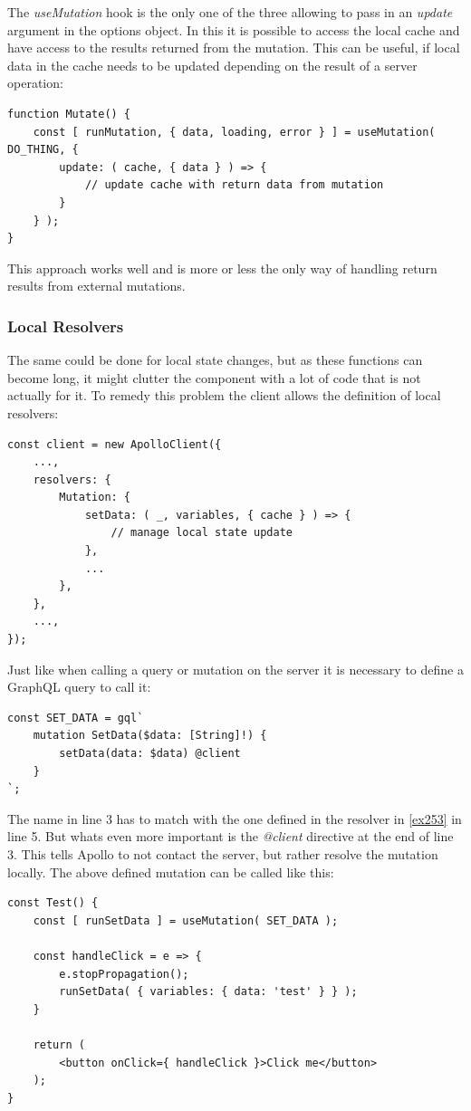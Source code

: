 The \emph{useMutation} hook is the only one of the three allowing to pass in an \emph{update} argument in the options object. In this it is possible to access the local cache and have access to the results returned from the mutation. This can be useful, if local data in the cache needs to be updated depending on the result of a server operation:
\begin{lstlisting}[caption={Creating a Mutation and defining a manual update function},label={ex:usingMutation}]
function Mutate() {
	const [ runMutation, { data, loading, error } ] = useMutation( DO_THING, {
		update: ( cache, { data } ) => {
			// update cache with return data from mutation
		}	
	} );
}
\end{lstlisting}
This approach works well and is more or less the only way of handling return results from external mutations. 

\subsubsection{Local Resolvers}
The same could be done for local state changes, but as these functions can become long, it might clutter the component with a lot of code that is not actually for it. To remedy this problem the client allows the definition of local resolvers:
\begin{lstlisting}[caption={Local Resolvers},label={ex253}]
const client = new ApolloClient({
	...,
	resolvers: {
		Mutation: {
			setData: ( _, variables, { cache } ) => {
				// manage local state update			
			},
			...		
		},	
	},
	...,
});
\end{lstlisting}

Just like when calling a query or mutation on the server it is necessary to define a GraphQL query to call it:
\lstset{language=GraphQL}
\begin{lstlisting}[caption={Query Definition for a Mutation in the Client}]
const SET_DATA = gql`
	mutation SetData($data: [String]!) {
		setData(data: $data) @client	
	}
`;
\end{lstlisting}
The name in line 3 has to match with the one defined in the resolver in \autoref{ex253} in line 5. But whats even more important is the \emph{@client} directive at the end of line 3. This tells Apollo to not contact the server, but rather resolve the mutation locally. The above defined mutation can be called like this:
\lstset{language=JavaScript}
\begin{lstlisting}[caption={Using the Client Side Mutation}]
const Test() {
	const [ runSetData ] = useMutation( SET_DATA );
	
	const handleClick = e => {
		e.stopPropagation();
		runSetData(	{ variables: { data: 'test' } } );
	}
	
	return (
		<button onClick={ handleClick }>Click me</button>
	);
}
\end{lstlisting}

